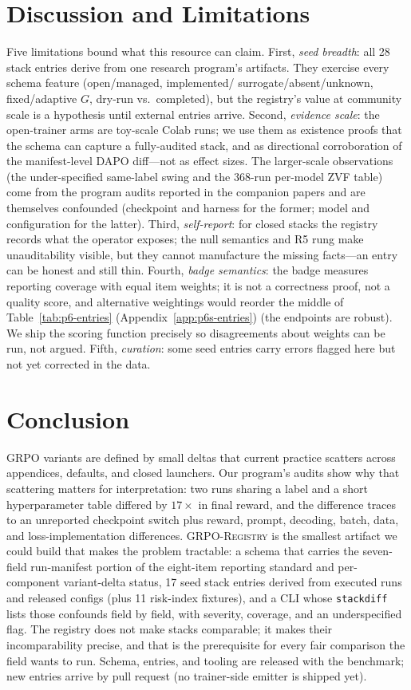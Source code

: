 \section{Discussion and Limitations}
\label{sec:p6-discussion}
Five limitations bound what this resource can claim. First, \emph{seed
breadth}: all 28 stack entries derive from one research program's
artifacts. They exercise every schema feature (open/managed, implemented/
surrogate/absent/unknown, fixed/adaptive $G$, dry-run vs.\ completed), but the
registry's value at community scale is a hypothesis until external entries
arrive. Second, \emph{evidence scale}: the open-trainer arms are toy-scale
Colab runs; we use them as existence proofs that the schema can capture a
fully-audited stack, and as directional corroboration of the manifest-level
DAPO diff---not as effect sizes. The larger-scale observations (the
under-specified same-label swing and the 368-run per-model ZVF table) come
from the program audits reported in the companion papers and are themselves
confounded (checkpoint and harness for the former; model and configuration
for the latter). Third, \emph{self-report}: for closed
stacks the registry records what the operator exposes; the null semantics and
R5 rung make unauditability visible, but they cannot manufacture the missing
facts---an entry can be honest and still thin. Fourth, \emph{badge
semantics}: the badge measures reporting coverage with equal item weights; it
is not a correctness proof, not a quality score, and alternative weightings
would reorder the middle of Table~\ref{tab:p6-entries}\ifdefined\SUBMISSIONBUILD{} (Appendix~\ref{app:p6s-entries})\fi{} (the endpoints are
robust). We ship the scoring function precisely so disagreements about
weights can be run, not argued. Fifth, \emph{curation}: some seed entries
carry errors flagged here but not yet corrected in the data.

\section{Conclusion}
\label{sec:p6-conclusion}
GRPO variants are defined by small deltas that current practice scatters
across appendices, defaults, and closed launchers. Our program's audits show
why that scattering matters for interpretation: two runs sharing a label and
a short hyperparameter table differed by $17\times$ in final reward, and the
difference traces to an unreported checkpoint switch plus reward, prompt,
decoding, batch, data, and loss-implementation differences.
\textsc{GRPO-Registry} is the smallest artifact we could build that makes the
problem tractable: a schema that
carries the seven-field run-manifest portion of the eight-item reporting
standard and per-component
variant-delta status, 17 seed stack entries derived from executed runs and
released configs (plus 11 risk-index fixtures), and a
CLI whose \texttt{stackdiff} lists those confounds field by field, with
severity, coverage, and an underspecified flag. The registry does not make
stacks comparable; it makes their incomparability precise, and that is the
prerequisite for every fair comparison the field wants to run. Schema,
entries, and tooling are released with the benchmark; new entries arrive by
pull request (no trainer-side emitter is shipped yet).
